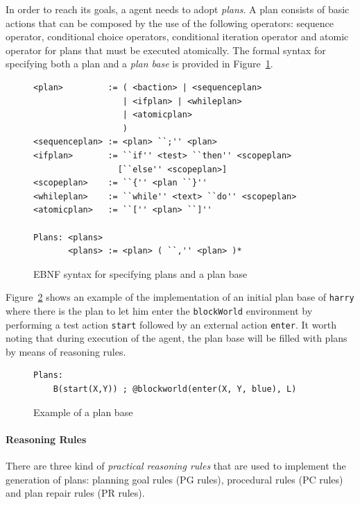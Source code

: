 \documentclass[a4paper]{article}
\begin{document}
In order to reach its goals, a agent needs to adopt \emph{plans}. A plan consists of basic actions that can be composed by the use of the following operators: sequence operator, conditional choice operators, conditional iteration operator and atomic operator for plans that must be executed atomically. The formal syntax for specifying both a plan and a \emph{plan base} is provided in Figure~\ref{fig:ebnf_plans}.

\begin{figure}[htp]
\begin{verbatim}
<plan>         := ( <baction> | <sequenceplan>
                  | <ifplan> | <whileplan>
                  | <atomicplan>
                  )
<sequenceplan> := <plan> ``;'' <plan>
<ifplan>       := ``if'' <test> ``then'' <scopeplan>
                 [``else'' <scopeplan>]
<scopeplan>    := ``{'' <plan ``}''
<whileplan>    := ``while'' <text> ``do'' <scopeplan>
<atomicplan>   := ``['' <plan> ``]''

Plans: <plans>
       <plans> := <plan> ( ``,'' <plan> )*
\end{verbatim}
\caption{EBNF syntax for specifying plans and a plan base}
\label{fig:ebnf_plans}
\end{figure}

Figure~\ref{fig:ebnf_planbase} shows an example of the implementation of an initial plan base of \texttt{harry} where there is the plan to let him enter the \texttt{blockWorld} environment by performing a test action \texttt{start} followed by an external action \texttt{enter}. It worth noting that during execution of the agent, the plan base will be filled with plans by means of reasoning rules.
 
\begin{figure}[htp]
\begin{verbatim}
Plans:
	B(start(X,Y)) ; @blockworld(enter(X, Y, blue), L)
\end{verbatim}	
\caption{Example of a plan base}
\label{fig:ebnf_planbase}
\end{figure}

\paragraph{Reasoning Rules}

There are three kind of \emph{practical reasoning rules} that are used to implement the generation of plans: planning goal rules (PG rules), procedural rules (PC rules) and plan repair rules (PR rules). 
\end{document}
